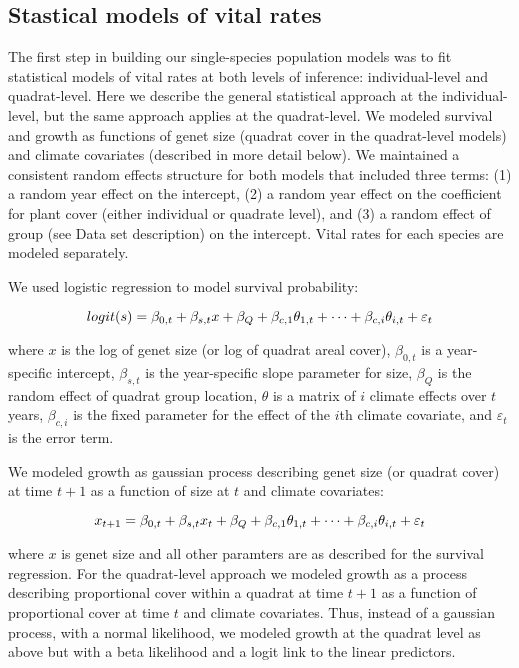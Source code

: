 \documentclass[12pt]{article}
\begin{document}
\subsection{Stastical models of vital rates}
The first step in building our single-species population models was to fit statistical models of vital rates at both levels of inference: individual-level and quadrat-level. Here we describe the general statistical approach at the individual-level, but the same approach applies at the quadrat-level. We modeled survival and growth as functions of genet size (quadrat cover in the quadrat-level models) and climate covariates (described in more detail below). We maintained a consistent random effects structure for both models that included three terms: (1) a random year effect on the intercept, (2) a random year effect on the coefficient for plant cover (either individual or quadrate level), and (3) a random effect of group (see Data set description) on the intercept. Vital rates for each species are modeled separately.

We used logistic regression to model survival probability:

\begin{equation}
logit(s) = \beta_{0,t} + \beta_{s,t}x + \beta_{Q} + \beta_{c,1}\theta_{1,t}\\
+ \cdots +  \beta_{c,i}\theta_{i,t} + \varepsilon_{t}
\end{equation}

\noindent where $x$ is the log of genet size (or log of quadrat areal cover), $\beta_{0,t}$ is a year-specific intercept, $\beta_{s,t}$ is the year-specific slope parameter for size, $\beta_{Q}$ is the random effect of quadrat group location, $\theta$ is a matrix of $i$ climate effects over $t$ years, $\beta_{c,i}$ is the fixed parameter for the effect of the $i$th climate covariate, and $\varepsilon_{t}$ is the error term. 

We modeled growth as gaussian process describing genet size (or quadrat cover) at time $t+1$ as a function of size at $t$ and climate covariates:

\begin{equation}
x_{t+1} = \beta_{0,t} + \beta_{s,t}x_{t} + \beta_{Q} + \beta_{c,1}\theta_{1,t}\\
+ \cdots +  \beta_{c,i}\theta_{i,t} + \varepsilon_{t}
\end{equation}

\noindent where $x$ is genet size and all other paramters are as described for the survival regression. For the quadrat-level approach we modeled growth as a process describing proportional cover within a quadrat at time $t+1$ as a function of proportional cover at time $t$ and climate covariates. Thus, instead of a gaussian process, with a normal likelihood, we modeled growth at the quadrat level as above but with a beta likelihood and a logit link to the linear predictors.  
\end{document}
